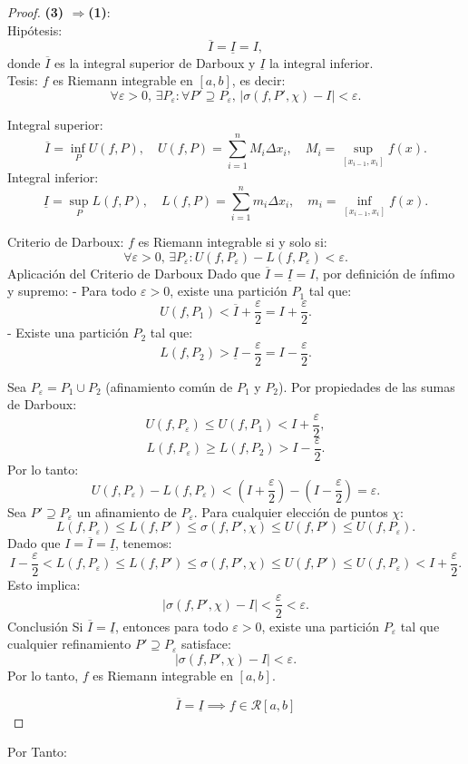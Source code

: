 \documentclass{article}
\begin{document}
	\begin{proof}\textbf{(3) \(\Rightarrow\)(1)}:\\
		Hipótesis:
		\[
		\overline{I} = \underline{I} = I,
		\]  
		donde \( \overline{I} \) es la integral superior de Darboux y \( \underline{I} \) la integral inferior.\\
		Tesis: 
		\( f \) es Riemann integrable en \([a, b]\), es decir:  
		\[
		\forall \varepsilon > 0,\, \exists P_\varepsilon : \forall P' \supseteq P_\varepsilon,\, |\sigma(f, P', \chi) - I| < \varepsilon.
		\]
		
		  Integral superior:
		 \[
		 \overline{I} = \inf_{P} U(f, P), \quad U(f, P) = \sum_{i=1}^n M_i \Delta x_i, \quad M_i = \sup_{[x_{i-1}, x_i]} f(x).
		 \]  
		 Integral inferior:
		 \[
		 \underline{I} = \sup_{P} L(f, P), \quad L(f, P) = \sum_{i=1}^n m_i \Delta x_i, \quad m_i = \inf_{[x_{i-1}, x_i]} f(x).
		 \]  
		 
		Criterio de Darboux:  
		\( f \) es Riemann integrable si y solo si:  
		\[
		\forall \varepsilon > 0,\, \exists P_\varepsilon : U(f, P_\varepsilon) - L(f, P_\varepsilon) < \varepsilon.
		\]
		Aplicación del Criterio de Darboux
		Dado que \( \overline{I} = \underline{I} = I \), por definición de ínfimo y supremo:  
		- Para todo \( \varepsilon > 0 \), existe una partición \( P_1 \) tal que:  
		\[
		U(f, P_1) < \overline{I} + \frac{\varepsilon}{2} = I + \frac{\varepsilon}{2}.
		\]  
		- Existe una partición \( P_2 \) tal que:  
		\[
		L(f, P_2) > \underline{I} - \frac{\varepsilon}{2} = I - \frac{\varepsilon}{2}.
		\]  
		
		Sea \( P_\varepsilon = P_1 \cup P_2 \) (afinamiento común de \( P_1 \) y \( P_2 \)). Por propiedades de las sumas de Darboux:  
		\[
		U(f, P_\varepsilon) \leq U(f, P_1) < I + \frac{\varepsilon}{2},
		\]  
		\[
		L(f, P_\varepsilon) \geq L(f, P_2) > I - \frac{\varepsilon}{2}.
		\]  
		Por lo tanto:  
		\[
		U(f, P_\varepsilon) - L(f, P_\varepsilon) < \left(I + \frac{\varepsilon}{2}\right) - \left(I - \frac{\varepsilon}{2}\right) = \varepsilon.
		\]  
		Sea \( P' \supseteq P_\varepsilon \) un afinamiento de \( P_\varepsilon \). Para cualquier elección de puntos \( \chi \):  
		\[
		L(f, P_\varepsilon) \leq L(f, P') \leq \sigma(f, P', \chi) \leq U(f, P') \leq U(f, P_\varepsilon).
		\]  
		Dado que \( I = \overline{I} = \underline{I} \), tenemos:  
		\[
		I - \frac{\varepsilon}{2} < L(f, P_\varepsilon) \leq L(f, P') \leq \sigma(f, P', \chi) \leq U(f, P') \leq U(f, P_\varepsilon) < I + \frac{\varepsilon}{2}.
		\]  
		Esto implica:  
		\[
		|\sigma(f, P', \chi) - I| < \frac{\varepsilon}{2} < \varepsilon.
		\]  
		Conclusión
		Si \( \overline{I} = \underline{I} \), entonces para todo \( \varepsilon > 0 \), existe una partición \( P_\varepsilon \) tal que cualquier refinamiento \( P' \supseteq P_\varepsilon \) satisface:  
		\[
		|\sigma(f, P', \chi) - I| < \varepsilon.
		\]  
		Por lo tanto, \( f \) es Riemann integrable en \([a, b]\).  
		
		\[
		\boxed{\overline{I} = \underline{I} \implies f \in \mathcal{R}[a, b]}
		\]
		
		
	\end{proof}
	
	Por Tanto:\\
	
	
\end{document}
